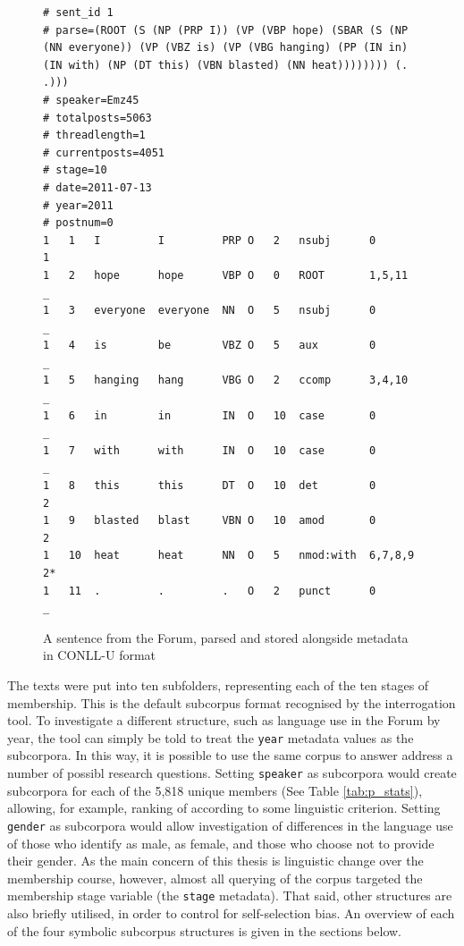 \begin{figure}[htb]
\begin{verbatim}
# sent_id 1
# parse=(ROOT (S (NP (PRP I)) (VP (VBP hope) (SBAR (S (NP (NN everyone)) (VP (VBZ is) (VP (VBG hanging) (PP (IN in) (IN with) (NP (DT this) (VBN blasted) (NN heat)))))))) (. .)))
# speaker=Emz45
# totalposts=5063
# threadlength=1
# currentposts=4051
# stage=10
# date=2011-07-13
# year=2011
# postnum=0
1   1   I         I         PRP O   2   nsubj      0       1
1   2   hope      hope      VBP O   0   ROOT       1,5,11  _
1   3   everyone  everyone  NN  O   5   nsubj      0       _
1   4   is        be        VBZ O   5   aux        0       _
1   5   hanging   hang      VBG O   2   ccomp      3,4,10  _
1   6   in        in        IN  O   10  case       0       _
1   7   with      with      IN  O   10  case       0       _
1   8   this      this      DT  O   10  det        0       2
1   9   blasted   blast     VBN O   10  amod       0       2
1   10  heat      heat      NN  O   5   nmod:with  6,7,8,9 2*
1   11  .         .         .   O   2   punct      0       _
\end{verbatim}
\caption[A parsed sentence with metadata]{A sentence from the Forum, parsed and stored alongside metadata in CONLL-U format}
\label{fig:parsed-text}
\end{figure}

The texts were put into ten subfolders, representing each of the ten stages of membership. This is the default subcorpus format recognised by the interrogation tool. To investigate a different structure, such as language use in the \gls{Forum} by year, the tool can simply be told to treat the \texttt{year} metadata values as the subcorpora. In this way, it is possible to use the same \gls{corpus} to answer address a number of possibl research questions. Setting \texttt{speaker} as subcorpora would create subcorpora for each of the 5,818 unique members (See Table \ref{tab:p_stats}), allowing, for example, ranking of  according to some linguistic criterion. Setting \texttt{gender} as subcorpora would allow investigation of differences in the language use of those who identify as male, as female, and those who choose not to provide their gender. As the main concern of this thesis is linguistic change over the membership course, however, almost all querying of the corpus targeted the membership stage variable (the \texttt{stage} metadata). That said, other structures are also briefly utilised, in order to control for self\hyp{}selection bias. An overview of each of the four symbolic subcorpus structures is given in the sections below.

